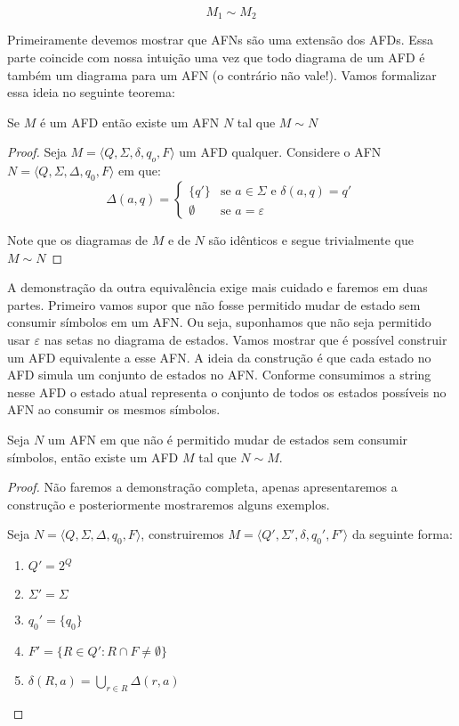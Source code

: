   \begin{displaymath}
    M_1 \sim M_2
  \end{displaymath}
\medskip

Primeiramente devemos mostrar que AFNs são uma extensão dos AFDs.
Essa parte coincide com nossa intuição uma vez que todo diagrama de um AFD é também um diagrama para um AFN (o contrário não vale!).
Vamos formalizar essa ideia no seguinte teorema:


\begin{theorem}
  Se $M$ é um AFD então existe um AFN $N$ tal que $M \sim N$
\end{theorem}
\begin{proof}
  Seja $M = \langle Q, \Sigma, \delta, q_o, F \rangle$ um AFD qualquer.
  Considere o AFN $N = \langle Q, \Sigma, \Delta, q_0, F \rangle$ em que:
\begin{displaymath}
 \Delta(a, q) = \left\{
 \begin{array}{cl}
   \{q'\} & \textrm{se $a \in \Sigma$ e }  \delta(a,q) = q'\\
   \emptyset & \textrm{se } a = \varepsilon
 \end{array} \right.
\end{displaymath}

Note que os diagramas de $M$ e de $N$ são idênticos e segue trivialmente que $M \sim N$
\end{proof}

A demonstração da outra equivalência exige mais cuidado e faremos em duas partes.
Primeiro vamos supor que não fosse permitido mudar de estado sem consumir símbolos em um AFN.
Ou seja, suponhamos que não seja permitido usar $\varepsilon$ nas setas no diagrama de estados.
Vamos mostrar que é possível construir um AFD equivalente a esse AFN.
A ideia da construção é que cada estado no AFD simula um conjunto de estados no AFN.
Conforme consumimos a string nesse AFD o estado atual representa o conjunto de todos os estados possíveis no AFN ao consumir os mesmos símbolos.


\begin{lemma}
  Seja $N$ um AFN em que não é permitido mudar de estados sem consumir símbolos, então existe um AFD $M$ tal que $N \sim M$.
\end{lemma}
\begin{proof}
  Não faremos a demonstração completa, apenas apresentaremos a construção e posteriormente mostraremos alguns exemplos.

  Seja $N = \langle Q, \Sigma, \Delta, q_0, F \rangle$, construiremos $M = \langle Q', \Sigma', \delta, q_0', F' \rangle$ da seguinte forma:

  \begin{enumerate}
  \item $Q' = 2^Q$
  \item $\Sigma' = \Sigma$
  \item $q_0' = \{q_0 \}$
  \item $F' = \{R \in Q' : R \cap F \neq \emptyset\}$
  \item $\delta(R, a) = \bigcup_{r \in R} \Delta(r,a)$
  \end{enumerate}
\end{proof}

